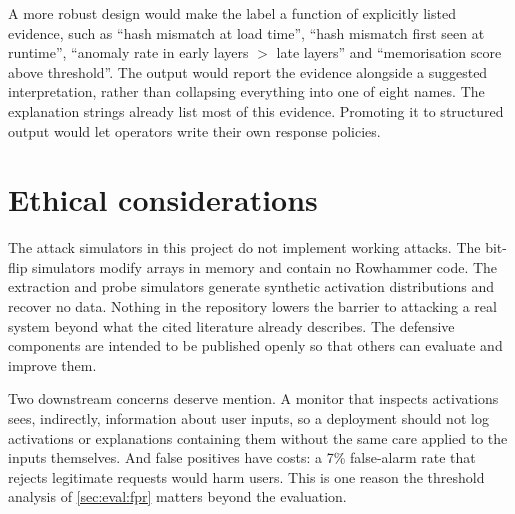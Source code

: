 A more robust design would make the label a function of explicitly listed evidence, such as
``hash mismatch at load time'', ``hash mismatch first seen at runtime'', ``anomaly rate in early
layers $>$ late layers'' and ``memorisation score above threshold''. The output would report the
evidence alongside a suggested interpretation, rather than collapsing everything into one of eight
names. The explanation strings already list most of this evidence. Promoting it to structured
output would let operators write their own response policies.

\section{Ethical considerations}
\label{sec:disc:ethics}

The attack simulators in this project do not implement working attacks. The bit-flip simulators
modify arrays in memory and contain no Rowhammer code. The extraction and probe simulators
generate synthetic activation distributions and recover no data. Nothing in the repository
lowers the barrier to attacking a real system beyond what the cited literature already
describes. The defensive components are intended to be published openly so that others can
evaluate and improve them.

Two downstream concerns deserve mention. A monitor that inspects activations sees, indirectly,
information about user inputs, so a deployment should not log activations or explanations
containing them without the same care applied to the inputs themselves. And false positives have
costs: a 7\% false-alarm rate that rejects legitimate requests would harm users. This is one
reason the threshold analysis of \cref{sec:eval:fpr} matters beyond the evaluation.
